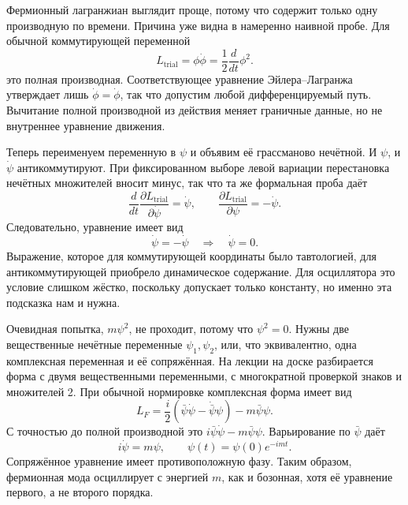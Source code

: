 Фермионный лагранжиан выглядит проще, потому что содержит только одну производную по времени. Причина уже видна в намеренно наивной пробе. Для обычной коммутирующей переменной
\begin{equation}
L_{\mathrm{trial}}=\phi\dot\phi
=\frac{1}{2}\frac{d}{dt}\phi^2.
\end{equation}
это полная производная. Соответствующее уравнение Эйлера--Лагранжа утверждает лишь \(\dot\phi=\dot\phi\), так что допустим любой дифференцируемый путь. Вычитание полной производной из действия меняет граничные данные, но не внутреннее уравнение движения.

Теперь переименуем переменную в \(\psi\) и объявим её грассманово нечётной. И \(\psi\), и \(\dot\psi\) антикоммутируют. При фиксированном выборе левой вариации перестановка нечётных множителей вносит минус, так что та же формальная проба даёт
\begin{equation}
\frac{d}{dt}\frac{\partial L_{\mathrm{trial}}}{\partial\dot\psi}
=\dot\psi,
\qquad
\frac{\partial L_{\mathrm{trial}}}{\partial\psi}
=-\dot\psi.
\end{equation}
Следовательно, уравнение имеет вид
\begin{equation}
\dot\psi=-\dot\psi
\quad\Longrightarrow\quad
\dot\psi=0.
\label{eq:l7-constant-fermion}
\end{equation}
Выражение, которое для коммутирующей координаты было тавтологией, для антикоммутирующей приобрело динамическое содержание. Для осциллятора это условие слишком жёстко, поскольку допускает только константу, но именно эта подсказка нам и нужна.

\begin{classroomqa}
\end{classroomqa}

Очевидная попытка, \(m\psi^2\), не проходит, потому что \(\psi^2=0\). Нужны две вещественные нечётные переменные \(\psi_1,\psi_2\), или, что эквивалентно, одна комплексная переменная и её сопряжённая. На лекции на доске разбирается форма с двумя вещественными переменными, с многократной проверкой знаков и множителей 2. При обычной нормировке комплексная форма имеет вид
\begin{equation}
L_F=\frac{i}{2}
\left(\bar\psi\dot\psi-\dot{\bar\psi}\psi\right)
-m\bar\psi\psi.
\label{eq:l7-fermion-lagrangian}
\end{equation}
С точностью до полной производной это \(i\bar\psi\dot\psi-m\bar\psi\psi\). Варьирование по \(\bar\psi\) даёт
\begin{equation}
i\dot\psi=m\psi,
\qquad
\psi(t)=\psi(0)e^{-imt}.
\label{eq:l7-fermion-eom}
\end{equation}
Сопряжённое уравнение имеет противоположную фазу. Таким образом, фермионная мода осциллирует с энергией \(m\), как и бозонная, хотя её уравнение первого, а не второго порядка.

